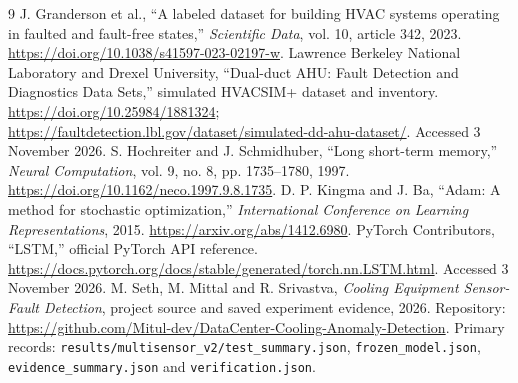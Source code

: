 \clearpage
{}
\begin{thebibliography}{9}
 J. Granderson et al., ``A labeled dataset for building HVAC systems operating in faulted and fault-free states,'' \emph{Scientific Data}, vol. 10, article 342, 2023. \url{https://doi.org/10.1038/s41597-023-02197-w}.
 Lawrence Berkeley National Laboratory and Drexel University, ``Dual-duct AHU: Fault Detection and Diagnostics Data Sets,'' simulated HVACSIM+ dataset and inventory. \url{https://doi.org/10.25984/1881324}; \url{https://faultdetection.lbl.gov/dataset/simulated-dd-ahu-dataset/}. Accessed 3 November 2026.
 S. Hochreiter and J. Schmidhuber, ``Long short-term memory,'' \emph{Neural Computation}, vol. 9, no. 8, pp. 1735--1780, 1997. \url{https://doi.org/10.1162/neco.1997.9.8.1735}.
 D. P. Kingma and J. Ba, ``Adam: A method for stochastic optimization,'' \emph{International Conference on Learning Representations}, 2015. \url{https://arxiv.org/abs/1412.6980}.
 PyTorch Contributors, ``LSTM,'' official PyTorch API reference. \url{https://docs.pytorch.org/docs/stable/generated/torch.nn.LSTM.html}. Accessed 3 November 2026.
 M. Seth, M. Mittal and R. Srivastva, \emph{Cooling Equipment Sensor-Fault Detection}, project source and saved experiment evidence, 2026. Repository: \url{https://github.com/Mitul-dev/DataCenter-Cooling-Anomaly-Detection}. Primary records: \texttt{results/multisensor\_v2/test\_summary.json}, \texttt{frozen\_model.json}, \texttt{evidence\_summary.json} and \texttt{verification.json}.
\end{thebibliography}

